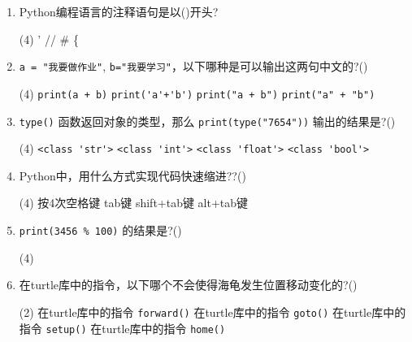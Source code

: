 \documentclass[11pt]{ctexart}
\begin{document}
\begin{enumerate}
        \item  Python编程语言的注释语句是以(\qquad)开头?
        \begin{tasks}(4)
            \task '
            \task //
            \task \#
            \task \{
        \end{tasks}

        \item \lstinline{a = "我要做作业"}, \lstinline!b="我要学习"!，以下哪种是可以输出这两句中文的?(\qquad)
        \begin{tasks}(4)
            \task \lstinline!print(a + b)!
            \task \lstinline!print('a'+'b')!
            \task \lstinline!print("a + b")!
            \task \lstinline!print("a" + "b")!
        \end{tasks}

        \item \lstinline!type()! 函数返回对象的类型，那么 \lstinline!print(type("7654"))! 输出的结果是?(\qquad)
        \begin{tasks}(4)
            \task \lstinline!<class 'str'>!
            \task \lstinline!<class 'int'>!
            \task \lstinline!<class 'float'>!
            \task \lstinline!<class 'bool'>!
        \end{tasks}

        \item Python中，用什么方式实现代码快速缩进??(\qquad)
        \begin{tasks}(4)
            \task 按4次空格键
            \task tab键
            \task shift+tab键
            \task alt+tab键
        \end{tasks}

        \item \lstinline!print(3456 % 100)! 的结果是?(\qquad)
        \begin{tasks}(4)
        \end{tasks}

        \item 在turtle库中的指令，以下哪个不会使得海龟发生位置移动变化的?(\qquad)
        \begin{tasks}(2)
            \task 在turtle库中的指令 \lstinline{forward()}
            \task 在turtle库中的指令 \lstinline{goto()}
            \task 在turtle库中的指令 \lstinline{setup()}
            \task 在turtle库中的指令 \lstinline{home()}
        \end{tasks}


\end{enumerate}
\end{document}
